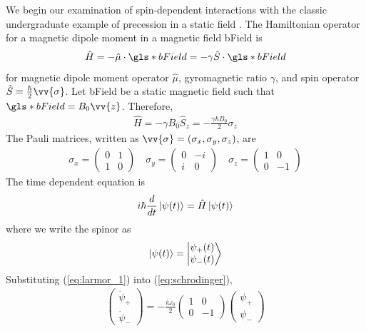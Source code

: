 We begin our examination of spin-dependent interactions with the classic undergraduate example of precession in a static field \cite{griffiths_quantum}. The Hamiltonian operator for a magnetic dipole moment in a magnetic field \gls*{bField} is
%
\begin{align}
    \hat{H}=-\hat{\mu}\cdot\gls*{bField}=-\gamma\hat{S}\cdot \gls*{bField}\label{eq:hamiltonian_operator}
\end{align}
%
for magnetic dipole moment operator $\hat{\mu}$, gyromagnetic ratio $\gamma$, and spin operator $\hat{S}=\frac{\hbar}{2}\vv{\sigma}$. Let \gls*{bField} be a static magnetic field such that $\gls*{bField}=B_0 \vv{z}$. Therefore,
%
\begin{gather}
    \hat{H}=-\gamma B_0 \hat{S}_z=-\frac{\gamma \hbar B_0}{2}\sigma_z\label{eq:larmor_1}
\end{gather}
%
The Pauli matrices, written as $\vv{\sigma}=(\sigma_x, \sigma_y, \sigma_z)$, are
%
\begin{gather}
    \sigma_{x}=\left(\begin{matrix}
    0 & 1\\
    1 & 0
    \end{matrix}\right)\quad
    \sigma_{y}=\left(\begin{matrix}
    0 & -i\\
    i & 0
    \end{matrix}\right)\quad
    \sigma_{z}=\left(\begin{matrix}
    1 & 0\\
    0 & -1
    \end{matrix}\right)
\end{gather}
%
The time dependent \schrodinger equation is
%
\begin{gather}
    i\hbar\frac{d}{dt}\Ket{\psi(t)}=\hat{H}\Ket{\psi(t)} \label{eq:schrodinger}
\end{gather}
%
where we write the spinor as 
\begin{gather}
    \Ket{\psi(t)}=\Ket{\begin{matrix}
        \psi_+(t)\\
        \psi_-(t)
    \end{matrix}}\label{eq:spinor}  
\end{gather}
%
Substituting (\ref{eq:larmor_1}) into (\ref{eq:schrodinger}),
\begin{gather}
    \left(\begin{matrix}
        \dot{\psi}_+\\
        \dot{\psi}_-
    \end{matrix}\right)
    = -\frac{i\omega_0}{2}
    \left(\begin{matrix}
        1 & 0\\
        0 & -1
    \end{matrix} \right)
    \left(\begin{matrix}
        \psi_+\\
        \psi_-
    \end{matrix}\right)\label{eq:larmor_2}
\end{gather}
